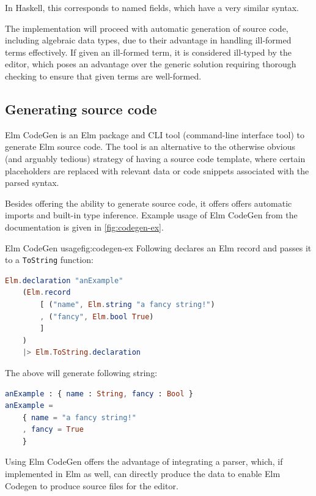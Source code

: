 In Haskell, this corresponds to named fields\cite{haskell-records-named-fields},
which have a very similar syntax.

The implementation will proceed with automatic generation of source code,
including algebraic data types, due to their advantage in handling ill-formed
terms effectively. If given an ill-formed term, it is considered ill-typed by
the editor, which poses an advantage over the generic solution requiring
thorough checking to ensure that given terms are well-formed.

\subsection{Generating source code}
Elm CodeGen\cite{elm-codegen-package} is an Elm package and
CLI tool (command-line interface tool) to generate Elm source code.
The tool is an alternative to the otherwise obvious (and arguably tedious)
strategy of having a source code template, where certain placeholders are
replaced with relevant data or code snippets associated with the parsed syntax.

Besides offering the ability to generate source code, it offers offers automatic
imports and built-in type inference. Example usage of Elm CodeGen from
the documentation\cite{elm-codegen-package} is given in \cref{fig:codegen-ex}.

\begin{myfigure}{Elm CodeGen usage}{fig:codegen-ex}
  Following declares an Elm record and passes it to a \texttt{ToString} function:

  \begin{lstlisting}[backgroundcolor=\color{myfigurecolorback},language=elm]
Elm.declaration "anExample"
    (Elm.record
        [ ("name", Elm.string "a fancy string!")
        , ("fancy", Elm.bool True)
        ]
    )
    |> Elm.ToString.declaration
\end{lstlisting}

  The above will generate following string:
  \begin{lstlisting}[backgroundcolor=\color{myfigurecolorback},language=elm]
anExample : { name : String, fancy : Bool }
anExample =
    { name = "a fancy string!"
    , fancy = True
    }
\end{lstlisting}
\end{myfigure}

Using Elm CodeGen offers the advantage of integrating a parser, which,
if implemented in Elm as well, can directly produce the data to enable
Elm Codegen to produce source files for the editor.

